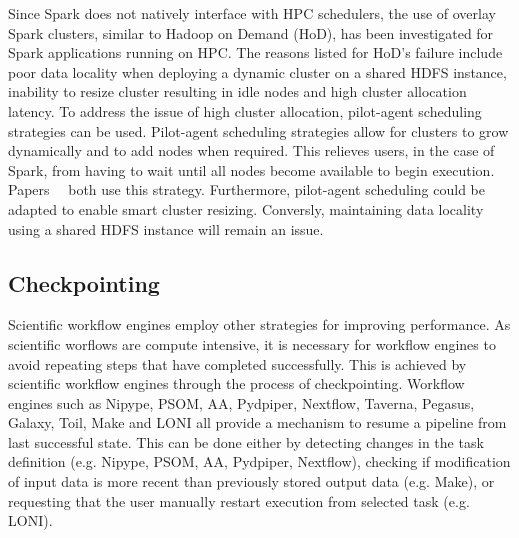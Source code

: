             Since Spark does not natively interface with HPC schedulers, the use
            of overlay Spark clusters, similar to Hadoop on Demand (HoD), has
            been investigated for Spark applications running on HPC. The reasons
            listed for HoD's failure include poor data locality when deploying a
            dynamic cluster on a shared HDFS instance, inability to resize
            cluster resulting in idle nodes and high cluster allocation latency.
            To address the issue of high cluster allocation, pilot-agent
            scheduling strategies can be used. Pilot-agent scheduling strategies
            allow for clusters to grow dynamically and to add nodes when
            required. This relieves users, in the case of Spark, from having to
            wait until all nodes become available to begin execution.
            Papers~\cite{7530058}~\cite{Baer:2015:IAS:2792745.2792779} both use
            this strategy. Furthermore, pilot-agent scheduling could be adapted
            to enable smart cluster resizing. Conversly, maintaining data
            locality using a shared HDFS instance will remain an issue. 
         

        \subsection{Checkpointing}\label{other}
        
                                                                                
            Scientific workflow engines employ other strategies for improving   
            performance. As scientific worflows are compute intensive, it is    
            necessary for workflow engines to avoid repeating steps that have   
            completed successfully. This is achieved by scientific workflow     
            engines through the process of checkpointing. Workflow engines such
            as Nipype, PSOM, AA, Pydpiper, Nextflow, Taverna, Pegasus, Galaxy,  
            Toil, Make and LONI all provide a mechanism to resume a pipeline    
            from last successful state. This can be done either by detecting    
            changes in the task definition (e.g. Nipype, PSOM, AA, Pydpiper,    
            Nextflow), checking if modification of input                        
            data is more recent than previously stored output data (e.g. Make),
            or requesting that the user manually restart execution from         
            selected task (e.g. LONI).                                          
                                                                                

